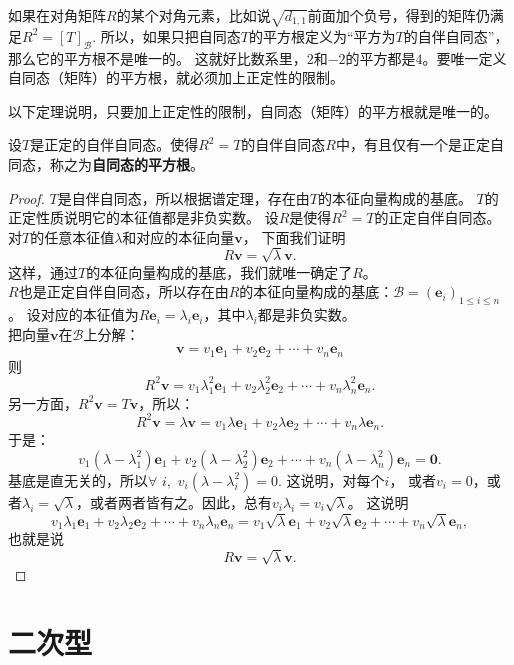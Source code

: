 \documentclass[12pt,UTF8,fontset=none]{ctexbook}
\begin{document}
如果在对角矩阵$R$的某个对角元素，比如说$\sqrt{d_{1,1}}$前面加个负号，得到的矩阵仍满足$R^2 = [T]_\mathcal{B}$. 
所以，如果只把自同态$T$的平方根定义为“平方为$T$的自伴自同态”，那么它的平方根不是唯一的。
这就好比数系里，$2$和$-2$的平方都是$4$。要唯一定义自同态（矩阵）的平方根，就必须加上正定性的限制。

以下定理说明，只要加上正定性的限制，自同态（矩阵）的平方根就是唯一的。
\begin{pp}\label{pp:8_13}
    设$T$是正定的自伴自同态。使得$R^2 = T$的自伴自同态$R$中，有且仅有一个是正定自同态，称之为\textbf{自同态的平方根}。
\end{pp}
\begin{proof} %
    $T$是自伴自同态，所以根据谱定理，存在由$T$的本征向量构成的基底。
    $T$的正定性质说明它的本征值都是非负实数。
    设$R$是使得$R^2 = T$的正定自伴自同态。对$T$的任意本征值$\lambda$和对应的本征向量$\mathbf{v}$，
    下面我们证明
    $$R\mathbf{v} = \sqrt{\lambda}\mathbf{v}.$$
    这样，通过$T$的本征向量构成的基底，我们就唯一确定了$R$。\\
    $R$也是正定自伴自同态，所以存在由$R$的本征向量构成的基底：$\mathcal{B} = (\mathbf{e}_i)_{1\leqslant i \leqslant n}$。
    设对应的本征值为$R\mathbf{e}_i = \lambda_i \mathbf{e}_i$，其中$\lambda_i$都是非负实数。\\
    把向量$\mathbf{v}$在$\mathcal{B}$上分解：
    $$ \mathbf{v} = v_1 \mathbf{e}_1 + v_2 \mathbf{e}_2 + \cdots + v_n \mathbf{e}_n $$
    则
    $$ R^2 \mathbf{v} = v_1 \lambda_1^2 \mathbf{e}_1 + v_2 \lambda_2^2 \mathbf{e}_2 + \cdots + v_n \lambda_n^2 \mathbf{e}_n. $$
    另一方面，$R^2 \mathbf{v} = T \mathbf{v}$，所以：
    $$ R^2 \mathbf{v} = \lambda \mathbf{v} = v_1 \lambda \mathbf{e}_1 + v_2 \lambda \mathbf{e}_2 + \cdots + v_n \lambda \mathbf{e}_n.$$
    于是：
    $$ v_1 (\lambda - \lambda_1^2) \mathbf{e}_1 + v_2 (\lambda - \lambda_2^2) \mathbf{e}_2 + \cdots + v_n (\lambda - \lambda_n^2) \mathbf{e}_n = \mathbf{0}.$$
    基底是直无关的，所以$\forall \,\, i ,\,\, v_i (\lambda - \lambda_i^2) = 0$. 这说明，对每个$i$，
    或者$v_i = 0$，或者$\lambda_i = \sqrt{\lambda}$，或者两者皆有之。因此，总有$v_i\lambda_i = v_i\sqrt{\lambda}$。
    这说明
    $$ v_1 \lambda_1 \mathbf{e}_1 + v_2 \lambda_2 \mathbf{e}_2 + \cdots + v_n \lambda_n \mathbf{e}_n = v_1 \sqrt{\lambda} \mathbf{e}_1 + v_2 \sqrt{\lambda} \mathbf{e}_2 + \cdots + v_n \sqrt{\lambda} \mathbf{e}_n, $$
    也就是说
    $$ R \mathbf{v} = \sqrt{\lambda} \mathbf{v}.$$
\end{proof}

\chapter{二次型}
\end{document}
